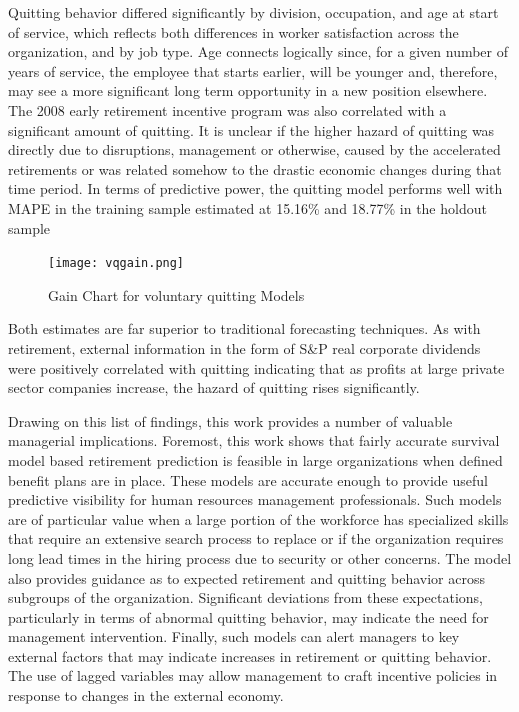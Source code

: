 \documentclass[12pt,letterpaper]{article}
\begin{document}
Quitting behavior differed significantly by division, occupation, and age at start of service, which reflects both differences in worker satisfaction across the organization, and by job type. Age connects logically since, for a given number of years of service, the employee that starts earlier, will be younger and, therefore, may see a more significant long term opportunity in a new position elsewhere.  The 2008 early retirement incentive program was also correlated with a significant amount of quitting.  It is unclear if the higher hazard of quitting was directly due to disruptions, management or otherwise, caused by the accelerated retirements or was related somehow to the drastic economic changes during that time period.  In terms of predictive power, the quitting model performs well with MAPE in the training sample estimated at 15.16\% and 18.77\% in the holdout sample
 \begin{figure}[htbp]
 	\centering
 	\texttt{[image: vqgain.png]}
 	\caption{Gain Chart for voluntary quitting Models}
 	\label{fig:vqgain}
 \end{figure}%
Both estimates are far superior to traditional forecasting techniques.  As with retirement, external information in the form of S\&P real corporate dividends were positively correlated with quitting indicating that as profits at large private sector companies increase, the hazard of quitting rises significantly.


Drawing on this list of findings, this work provides a number of valuable managerial implications.  Foremost, this work shows that fairly accurate survival model based retirement prediction is feasible in large organizations when defined benefit plans are in place.  These models are accurate enough to provide useful predictive visibility for human resources management professionals.  Such models are of particular value when a large portion of the workforce has specialized skills that require an extensive search process to replace or if the organization requires long lead times in the hiring process due to security or other concerns.  The model also provides guidance as to expected retirement and quitting behavior across subgroups of the organization. Significant deviations from these expectations, particularly  in terms of  abnormal quitting behavior, may indicate the need for management intervention.  Finally, such models can alert managers to key external factors that may indicate increases in retirement or quitting behavior.  The use of lagged variables may allow management to craft incentive policies in response to changes in the external economy.
\end{document}

